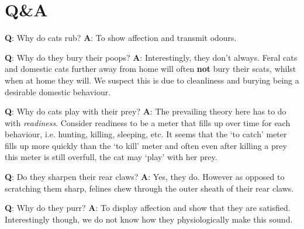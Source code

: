 \documentclass{article}
\begin{document}
\section*{Q\&A}
\begin{minipage}{9cm}
    \textbf{Q}: Why do cats rub?
    \textbf{A}: To show affection and transmit odours.
\end{minipage}
\begin{minipage}{9cm}
    \textbf{Q}: Why do they bury their poops?
    \textbf{A}: Interestingly, they don't always. Feral cats and domestic cats further away from home will often \textbf{not} bury their scats, whilst when at home they will. We suspect this is due to cleanliness and burying being a desirable domestic behaviour.
\end{minipage}
\begin{minipage}{9cm}
    \textbf{Q}: Why do cats play with their prey?
    \textbf{A}: The prevailing theory here has to do with \emph{readiness}. Consider readiness to be a meter that fills up over time for each behaviour, i.e. hunting, killing, sleeping, etc. It seems that the `to catch' meter fills up more quickly than the `to kill' meter and often even after killing a prey this meter is still overfull, the cat may `play' with her prey.
\end{minipage}
\begin{minipage}{9cm}
    \textbf{Q}: Do they sharpen their rear claws?
    \textbf{A}: Yes, they do. However as opposed to scratching them sharp, felines chew through the outer sheath of their rear claws.
\end{minipage}
\begin{minipage}{9cm}
    \textbf{Q}: Why do they purr?
    \textbf{A}: To display affection and show that they are satisfied. Interestingly though, we do not know how they physiologically make this sound.
\end{minipage}

\end{document}
